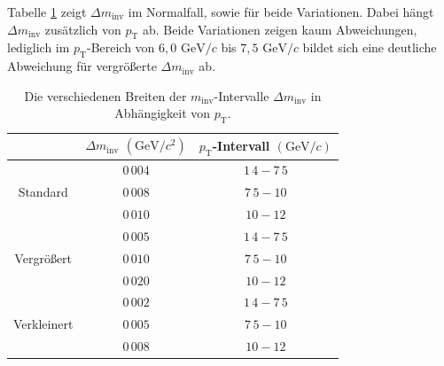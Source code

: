 Tabelle \ref{tab:Binning} zeigt $\Delta m_\text{inv}$ im Normalfall, sowie für beide Variationen.
Dabei hängt $\Delta m_\text{inv}$ zusätzlich von $p_\text{T}$ ab.
\newline
Beide Variationen zeigen kaum Abweichungen, lediglich im $p_\text{T}$-Bereich von $6,0 \text{ GeV}/c$ bis $7,5 \text{ GeV}/c$ bildet sich eine deutliche Abweichung für vergrößerte $\Delta m_\text{inv}$ ab.
\begin{table}[b!]
\centering
\begin{tabular}{c|c|c|}
\cline{2-3}
                                                          & $\Delta m_\text{inv}$ $\left(\text{GeV}/c^{2}\right)$ & $p_\text{T}$-Intervall $\left(\text{GeV}/c\right)$ \\ \hline
\multicolumn{1}{|c|}{\multirow{3}{*}{Standard}}           & $0\,004$                                              & $1\,4-7\,5$                                        \\ \cline{2-3} 
\multicolumn{1}{|c|}{}                                    & $0\,008$                                              & $7\,5-10$                                          \\ \cline{2-3} 
\multicolumn{1}{|c|}{}                                    & $0\,010$                                              & $10-12$                                            \\ \hline \hline
\multicolumn{1}{|c|}{\multirow{3}{*}{Vergr{\"o}{\ss}ert}} & $0\,005$                                              & $1\,4-7\,5$                                        \\ \cline{2-3} 
\multicolumn{1}{|c|}{}                                    & $0\,010$                                              & $7\,5-10$                                          \\ \cline{2-3} 
\multicolumn{1}{|c|}{}                                    & $0\,020$                                              & $10-12$                                            \\ \hline \hline
\multicolumn{1}{|c|}{\multirow{3}{*}{Verkleinert}}        & $0\,002$                                              & $1\,4-7\,5$                                        \\ \cline{2-3} 
\multicolumn{1}{|c|}{}                                    & $0\,005$                                               & $7\,5-10$                                          \\ \cline{2-3} 
\multicolumn{1}{|c|}{}                                    & $0\,008$                                              & $10-12$                                            \\ \hline
\end{tabular}
\caption{Die verschiedenen Breiten der $m_\text{inv}$-Intervalle $\Delta m_\text{inv}$ in Abhängigkeit von $p_\text{T}$.}
\label{tab:Binning}
\end{table}
